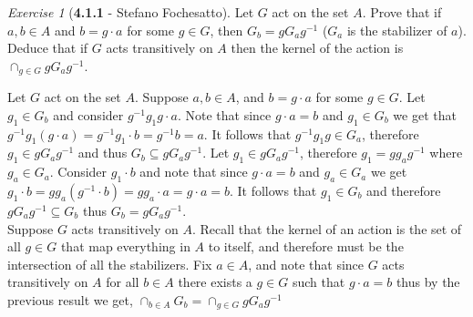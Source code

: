 \documentclass[12pt]{amsart}
\makeatletter
\theoremstyle{remark}
\newtheorem*{exercise}{Exercise}%
\renewenvironment{proof}[1][\proofname]{\par\doublespacing
  \pushQED{\qed}%
  \normalfont \topsep6\p@\@plus6\p@\relax
  \list{}{%
    \settowidth{\leftmargin}{\itshape\proofname:\hskip\labelsep}%
    \setlength{\labelwidth}{0pt}%
    \setlength{\itemindent}{-\leftmargin}%
  }%
  \item[\hskip\labelsep\itshape#1\@addpunct{:}]\ignorespaces
}{%
  \popQED\endlist\@endpefalse
  \singlespacing
}
\theoremstyle{mycomment}
\makeatother
\begin{document}
\thispagestyle{fancy}
\author{Coordinator: Glen Woodworth}





\begin{exercise}[\textbf{4.1.1} - Stefano Fochesatto] Let $G$ act on the set $A$. Prove that if $a, b \in A$ and 
  $b = g\cdot a$ for some $g \in G$, then $G_b = gG_ag^{-1}$ ($G_a$ is the stabilizer of $a$). 
  Deduce that if $G$ acts transitively on $A$ then the kernel of the action is $\cap_{g \in G} gG_ag^{-1}$. 
  \begin{proof} Let $G$ act on the set $A$. Suppose $a, b \in A$, and $b = g\cdot a$ for some $g \in G$. Let $g_1 \in G_b$ and consider 
    $g^{-1}g_1g \cdot a$. Note that since $g \cdot a = b$ and $g_1 \in G_b$ we get that $g^{-1}g_1(g \cdot a) = g^{-1}g_1\cdot b = g^{-1}b = a$.
    It follows that $g^{-1}g_1g \in G_a$, therefore $g_1\in gG_ag^{-1}$ and thus $G_b \subseteq gG_ag^{-1}$. Let $g_1 \in gG_ag^{-1}$, therefore 
    $g_1 = gg_ag^{-1}$ where $g_a \in G_a$. Consider $g_1 \cdot b$ and note that since $g \cdot a = b$ and $g_a \in G_a$ we get 
    $g_1 \cdot b = gg_a(g^{-1} \cdot b) = gg_a \cdot a = g \cdot a = b$. It follows that $g_1 \in G_b$ and therefore $gG_ag^{-1} \subseteq G_b$ thus 
    $G_b = gG_ag^{-1}$.\\

    Suppose $G$ acts transitively on $A$. Recall that the kernel of an action is the set of all $g \in G$ that map 
    everything in $A$ to itself, and therefore must be the intersection of all the stabilizers. Fix $a \in A$, and note that since 
    $G$ acts transitively on $A$ for all $b \in A$ there exists a $g \in G$ such that $g\cdot a = b$ thus by the previous result we get,
    $\cap_{b \in A} G_b = \cap_{g \in G} gG_ag^{-1}$
  
  \end{proof}
\end{exercise}
\vspace{.15in}
\end{document}
